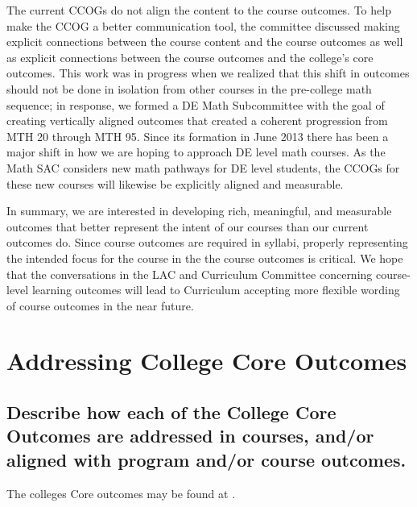 The current CCOGs do not align the content to the course outcomes. To help
make the CCOG a better communication tool, the committee discussed making
explicit connections between the course content and the course outcomes as well
as explicit connections between the course outcomes and the college's core
outcomes.  This work was in progress when we realized that this shift in
outcomes should not be done in isolation from other courses in the pre-college
math sequence; in response, we formed a DE Math Subcommittee with the goal of
creating vertically aligned outcomes that created a coherent progression from
MTH 20 through MTH 95.  Since its formation in June 2013 there has been a major 
shift in how we are hoping to approach DE level math courses.  As the Math SAC
considers new math pathways for DE level students, the CCOGs for these new
courses will likewise be explicitly aligned and measurable.

In summary, we are interested in developing rich, meaningful, and measurable
outcomes that better represent the intent of our courses than our current
outcomes do. Since course outcomes are required in syllabi, properly
representing the intended focus for the course in the the course outcomes is
critical. We hope that the conversations in the LAC and Curriculum Committee
concerning course-level learning outcomes will lead to Curriculum accepting more
flexible wording of course outcomes in the near future.

\section{Addressing College Core Outcomes}

\subsection{Describe how each of the College Core Outcomes are addressed in
courses, and/or aligned with program and/or course outcomes.}

The colleges Core outcomes may be found at \cite{coreoutcomes}.

